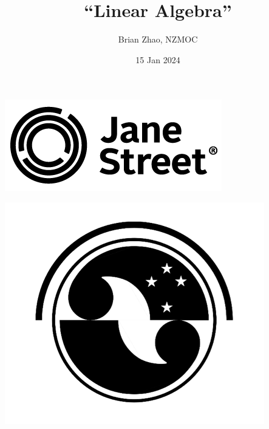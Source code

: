 \documentclass[11pt]{scrartcl}
\author{Brian Zhao, NZMOC}
\begin{document}
\noindent %
\begin{minipage}[c]{0.2\textwidth} %
    \includegraphics[width=\textwidth]{jane-street-logo.png}
\end{minipage}
\begin{minipage}[c]{0.6\textwidth} %
    \title{``Linear Algebra''}
    \date{15 Jan 2024}
    \maketitle
\end{minipage}
\hfill %
\begin{minipage}[c]{0.2\textwidth} %
    \includegraphics[width=\textwidth]{nzmoc-logo.png}
\end{minipage}
\end{document}
